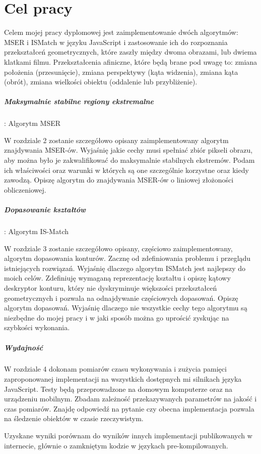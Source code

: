 \section{Cel pracy}

Celem mojej pracy dyplomowej jest zaimplementowanie dwóch algorytmów: MSER i
ISMatch w języku JavaScript i zastosowanie ich do rozpoznania przekształceń
geometrycznych, które zaszły między dwoma obrazami, lub dwiema klatkami filmu.
Przekształcenia afiniczne, które będą brane pod uwagę to: zmiana położenia
(przesunięcie), zmiana perspektywy (kąta widzenia), zmiana kąta (obrót), zmiana
wielkości obiektu (oddalenie lub przybliżenie).

\subparagraph{Maksymalnie stabilne regiony ekstremalne}: Algorytm MSER

W rozdziale 2 zostanie szczegółowo opisany zaimplementowany algorytm
znajdywania MSER-ów. Wyjaśnię jakie cechy musi spełniać zbiór pikseli obrazu,
aby można było je zakwalifikować do maksymalnie stabilnych ekstremów.  Podam
ich właściwości oraz warunki w których są one szczególnie korzystne oraz kiedy
zawodzą. Opiszę algorytm do znajdywania MSER-ów o liniowej złożoności
obliczeniowej.

\subparagraph{Dopasowanie kształtów}: Algorytm IS-Match

W rozdziale 3 zostanie szczegółowo opisany, częściowo zaimplementowany,
algorytm dopasowania konturów. Zacznę od zdefiniowania problemu i przeglądu
istniejących rozwiązań. Wyjaśnię dlaczego algorytm ISMatch jest najlepszy do
moich celów. Zdefiniuję wymaganą reprezentację kształtu i opiszę kątowy
deskryptor konturu, który nie dyskryminuje większości przekształceń
geometrycznych i pozwala na odnajdywanie częściowych dopasowań. Opiszę algorytm
dopasowań. Wyjaśnię dlaczego nie wszystkie cechy tego algorytmu są niezbędne do
mojej pracy i w jaki sposób można go uprościć zyskując na szybkości wykonania.

\subparagraph{Wydajność}

W rozdziale 4 dokonam pomiarów czasu wykonywania i zużycia pamięci
zaproponowanej implementacji na wszystkich dostępnych mi silnikach języka
JavaScript. Testy będą przeprowadzone na domowym komputerze oraz na urządzeniu
mobilnym.  Zbadam zależność przekazywanych parametrów na jakość i czas
pomiarów. Znajdę odpowiedź na pytanie czy obecna implementacja pozwala na
śledzenie obiektów w czasie rzeczywistym.

Uzyskane wyniki porównam do wyników innych implementacji publikowanych w
internecie, głównie o zamkniętym kodzie w językach pre-kompilowanych.

